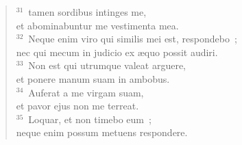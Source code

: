\begin{flushleft}
\begin{verse}
${}^{31}$~tamen sordibus intinges me,\\ et abominabuntur me vestimenta mea.\\
${}^{32}$~Neque enim viro qui similis mei est, respondebo~;\\ nec qui mecum in judicio ex \ae quo possit audiri.\\
${}^{33}$~Non est qui utrumque valeat arguere,\\ et ponere manum suam in ambobus.\\
${}^{34}$~Auferat a me virgam suam,\\ et pavor ejus non me terreat.\\
${}^{35}$~Loquar, et non timebo eum~;\\ neque enim possum metuens respondere.\end{verse}\end{flushleft}


